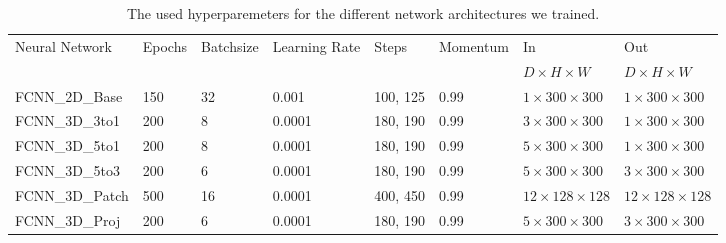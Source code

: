 \begin{sidewaystable}[htbp]
   \centering
   \caption[Hyperparameters]{The used hyperparemeters for the different network architectures we trained.}
   \begin{tabular}{l*{7}{l}}
      \toprule
      Neural Network & Epochs	& Batchsize & Learning Rate & Steps & Momentum & In & Out \\
      		&			&	&	&	&	& $D \times H \times W$	&  $D \times H \times W$	\\
      \midrule
      FCNN\_2D\_Base	& 150	& 32	& 0.001	& 100, 125 & 0.99	& $1 \times 300 \times 300$	& $1 \times 300 \times 300$ \\
      \midrule
      FCNN\_3D\_3to1 & 200	& 8	& 0.0001 & 180, 190 & 0.99 & $3 \times 300 \times 300$ & $1 \times 300 \times 300$ \\
      FCNN\_3D\_5to1 	& 200	& 8	& 0.0001 & 180, 190 & 0.99 & $5 \times 300 \times 300$ & $1 \times 300 \times 300$ \\
      FCNN\_3D\_5to3 	& 200	& 6	& 0.0001 & 180, 190 & 0.99 & $5 \times 300 \times 300$ & $3 \times 300 \times 300$ \\
      FCNN\_3D\_Patch & 500	& 16	& 0.0001 & 400, 450 & 0.99 & $12 \times 128 \times 128$ & $12 \times 128 \times 128$ \\
      FCNN\_3D\_Proj & 200	& 6	& 0.0001 & 180, 190 & 0.99 & $5 \times 300 \times 300$ & $3 \times 300 \times 300$ \\
      \bottomrule
   \end{tabular}
   \label{tab:hyperparameters}
\end{sidewaystable}




